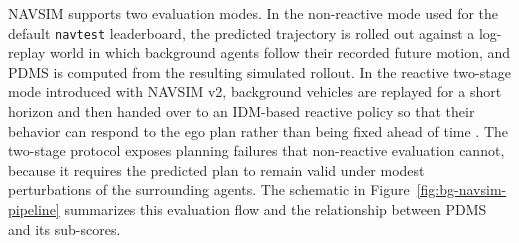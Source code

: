 NAVSIM supports two evaluation modes. In the non-reactive mode used for the default \texttt{navtest} leaderboard, the predicted trajectory is rolled out against a log-replay world in which background agents follow their recorded future motion, and PDMS is computed from the resulting simulated rollout. In the reactive two-stage mode introduced with NAVSIM v2, background vehicles are replayed for a short horizon and then handed over to an IDM-based reactive policy so that their behavior can respond to the ego plan rather than being fixed ahead of time \cite{navsim-v2-2024,dauner-pdm-2023}. The two-stage protocol exposes planning failures that non-reactive evaluation cannot, because it requires the predicted plan to remain valid under modest perturbations of the surrounding agents. The schematic in Figure~\ref{fig:bg-navsim-pipeline} summarizes this evaluation flow and the relationship between PDMS and its sub-scores.

